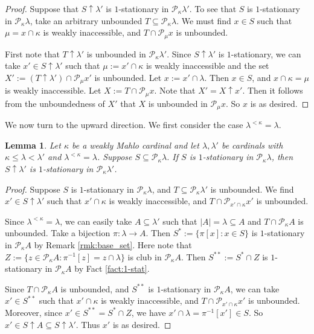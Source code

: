 \documentclass[a4paper,12pt,reqno,oneside]{amsart}
\theoremstyle{plain}
\newtheorem{lemma}[theorem]{Lemma}
\newcommand{\mcal}{\mathcal}
\begin{document}
\begin{proof}
Suppose that $S \uparrow \lambda '$ is $1$-stationary in $\mcal{P}_{\kappa}{\lambda'}$. To see that $S$ is $1$-stationary in $\mcal{P}_\kappa \lambda$, take an arbitrary unbounded $T \subseteq \mcal{P}_\kappa \lambda$. We must find $x \in S$ such that $\mu = x \cap \kappa$ is weakly inaccessible, and $T \cap \mcal{P}_\mu x$ is unbounded.

First note that $T \uparrow \lambda '$ is unbounded in $\mcal{P}_\kappa \lambda '$. Since $S \uparrow \lambda '$ is $1$-stationary, we can take $x' \in S \uparrow \lambda '$ such that $\mu := x' \cap \kappa$ is weakly inaccessible and the set $X' := ( T \uparrow \lambda ' ) \cap \mcal{P}_\mu x'$ is unbounded. Let $x := x' \cap \lambda$. Then $x \in S$, and $x \cap \kappa = \mu$ is weakly inaccessible. Let $X := T \cap \mcal{P}_\mu x$. Note that $X' = X \uparrow x'$. Then it follows from the unboundedness of $X'$ that $X$ is unbounded in $\mcal{P}_\mu x$. So $x$ is as desired.
\end{proof}  %

We now turn to the upward direction. We first consider the case $\lambda^{<\kappa} = \lambda$.

\begin{lemma}\label{mltrr}
Let $\kappa$ be a weakly Mahlo cardinal and let $\lambda , \lambda '$ be cardinals with $\kappa \leq \lambda < \lambda'$ and $\lambda^{<\kappa}=\lambda$. Suppose $S \subseteq \mcal{P}_{\kappa}\lambda$. If $S$ is $1$-stationary in $\mcal{P}_{\kappa}\lambda$, then $S \uparrow \lambda'$ is $1$-stationary in $\mcal{P}_{\kappa}{\lambda'}$.
\end{lemma}


\begin{proof}
Suppose $S$ is $1$-stationary in $\mcal{P}_\kappa \lambda$, and $T \subseteq \mcal{P}_\kappa \lambda '$ is unbounded. We find $x' \in S \uparrow \lambda '$ such that $x' \cap \kappa$ is weakly inaccessible, and $T \cap \mcal{P}_{x' \cap \kappa} x'$ is unbounded.

Since $\lambda^{< \kappa}= \lambda$, we can easily take $A \subseteq \lambda '$ such that $|A| = \lambda \subseteq A$ and $T \cap \mcal{P}_\kappa A$ is unbounded. Take a bijection $\pi: \lambda \rightarrow A$. Then $S^* := \{ \pi [x] : x \in S \}$ is $1$-stationary in $\mcal{P}_{\kappa}{A}$ by Remark \ref{rmk:base_set}. Here note that $Z := \{ z \in \mcal{P}_\kappa A :\pi^{-1} [z] = z \cap \lambda \}$ is club in $\mcal{P}_\kappa A$. Then $S^{**} := S^* \cap Z$ is $1$-stationary in $\mcal{P}_\kappa A$ by Fact \ref{fact:1-stat}.

Since $T \cap \mcal{P}_\kappa A$ is unbounded, and $S^{**}$ is $1$-stationary in $\mcal{P}_\kappa A$, we can take $x' \in S^{**}$ such that $x' \cap \kappa$ is weakly inaccessible, and $T \cap \mcal{P}_{x' \cap \kappa} x'$ is unbounded. Moreover, since $x' \in S^{**} = S^* \cap Z$, we have $x' \cap \lambda = \pi^{-1} [x'] \in S$. So $x' \in S \uparrow A \subseteq S \uparrow \lambda '$. Thus $x'$ is as desired.
\end{proof}
\end{document}
